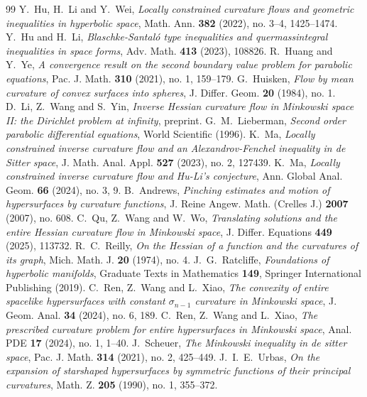 \documentclass[10pt,a4paper]{amsart}
\numberwithin{equation}{section}
\begin{document}
\begin{thebibliography}{99}
 Y.~Hu, H.~Li and Y.~Wei, {\em Locally constrained curvature flows and geometric inequalities in hyperbolic space}, Math. Ann. {\bf 382} (2022), no. 3--4, 1425--1474.
 Y.~Hu and H.~Li, {\em Blaschke-Santaló type inequalities and quermassintegral inequalities in space forms}, Adv. Math. {\bf 413} (2023), 108826.
 R.~Huang and Y.~Ye, {\em A convergence result on the second boundary value problem for parabolic equations}, Pac. J. Math. {\bf 310} (2021), no. 1, 159--179.
 G.~Huisken, {\em Flow by mean curvature of convex surfaces into spheres}, J. Differ. Geom. {\bf 20} (1984), no. 1.
 D.~Li, Z.~Wang and S.~Yin, {\em Inverse Hessian curvature flow in Minkowski space II: the Dirichlet problem at infinity}, preprint.
 G.~M.~Lieberman, {\em Second order parabolic differential equations}, World Scientific (1996).
 K.~Ma, {\em Locally constrained inverse curvature flow and an Alexandrov-Fenchel inequality in de Sitter space}, J. Math. Anal. Appl. {\bf 527} (2023), no. 2, 127439.
 K.~Ma, {\em Locally constrained inverse curvature flow and Hu-Li's conjecture}, Ann. Global Anal. Geom. {\bf 66} (2024), no. 3, 9.
 B.~Andrews, {\em Pinching estimates and motion of hypersurfaces by curvature functions}, J. Reine Angew. Math. (Crelles J.) {\bf 2007} (2007), no. 608.
 C.~Qu, Z.~Wang and W.~Wo, {\em Translating solutions and the entire Hessian curvature flow in Minkowski space}, J. Differ. Equations {\bf 449} (2025), 113732.
 R.~C.~Reilly, {\em On the Hessian of a function and the curvatures of its graph}, Mich. Math. J. {\bf 20} (1974), no. 4.
 J.~G.~Ratcliffe, {\em Foundations of hyperbolic manifolds}, Graduate Texts in Mathematics {\bf 149}, Springer International Publishing (2019).
 C.~Ren, Z.~Wang and L.~Xiao, {\em The convexity of entire spacelike hypersurfaces with constant $\sigma_{n-1}$ curvature in Minkowski space}, J. Geom. Anal. {\bf 34} (2024), no. 6, 189.
 C.~Ren, Z.~Wang and L.~Xiao, {\em The prescribed curvature problem for entire hypersurfaces in Minkowski space}, Anal. PDE {\bf 17} (2024), no. 1, 1--40.
 J.~Scheuer, {\em The Minkowski inequality in de sitter space}, Pac. J. Math. {\bf 314} (2021), no. 2, 425--449.
 J.~I.~E.~Urbas, {\em On the expansion of starshaped hypersurfaces by symmetric functions of their principal curvatures}, Math. Z. {\bf 205} (1990), no. 1, 355--372.

\end{thebibliography}
\end{document}
